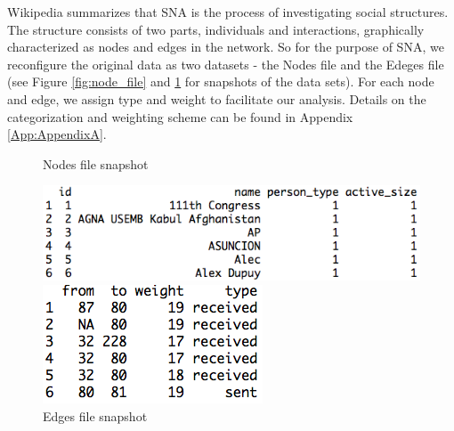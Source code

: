 Wikipedia summarizes that SNA  is the process of investigating social structures\cite{wiki_sna}. The structure consists of two parts, individuals and interactions, graphically characterized as nodes and edges in the network. So for the purpose of SNA, we reconfigure the original data as two datasets - the Nodes file and the Edeges file (see Figure \ref{fig:node_file} and \ref{fig:edge_file} for snapshots of the data sets). For each node and edge, we assign type and weight to facilitate our analysis. Details on the categorization and weighting scheme can be found in Appendix \ref{App:AppendixA}.
\begin{figure}[ht]
\caption{Nodes file snapshot}
\label{fig:node_file}
\centering
\includegraphics[width=.68\textwidth]{zoe/report_node_file}

\caption{Edges file snapshot}
\label{fig:edge_file}
\centering
\includegraphics[width=.35\textwidth]{zoe/report_edge_file}
\end{figure}
